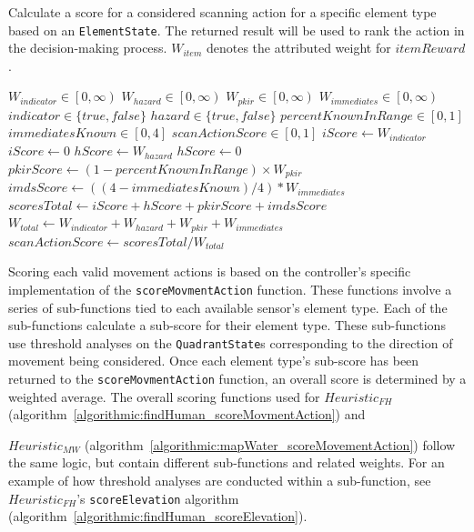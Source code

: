 \begin{algorithm}[H]
  \caption[Heuristic - Score Potential Scan Action]{Calculate a score for a considered scanning action for a specific element type based on an \texttt{ElementState}. The returned result will be used to rank the action in the decision-making process. $W_{item}$ denotes the attributed weight for $itemReward$.}
  \begin{algorithmic} \label{algorithmic:score_scan_action}
    \REQUIRE $W_{indicator} \in \left[0, \infty \right)$
    \REQUIRE $W_{hazard} \in \left[0, \infty \right)$
    \REQUIRE $W_{pkir} \in \left[0, \infty \right)$
    \REQUIRE $W_{immediates} \in \left[0, \infty \right)$
    \REQUIRE $indicator \in \{true, false\}$
    \REQUIRE $hazard \in \{true, false\}$
    \REQUIRE $percentKnownInRange \in \left[0, 1 \right]$
    \REQUIRE $immediatesKnown \in \left[0, 4 \right]$
    \ENSURE $scanActionScore \in \left[0, 1 \right]$
      \STATE $iScore \leftarrow W_{indicator}$
    \ELSE
      \STATE $iScore \leftarrow 0$
    \ENDIF
      \STATE $hScore \leftarrow W_{hazard}$
    \ELSE
      \STATE $hScore \leftarrow 0$
    \ENDIF
    \STATE $pkirScore \leftarrow (1 - percentKnownInRange) \times W_{pkir}$
    \STATE $imdsScore \leftarrow ((4 - immediatesKnown) / 4) * W_{immediates}$
    \STATE $scoresTotal \leftarrow iScore + hScore + pkirScore + imdsScore$
    \STATE $W_{total} \leftarrow W_{indicator} + W_{hazard} + W_{pkir} + W_{immediates}$
    \RETURN $scanActionScore \leftarrow scoresTotal / W_{total}$
  \end{algorithmic}
\end{algorithm}
\vspace*{-2em}

Scoring each valid movement actions is based on the controller's specific implementation of the \texttt{scoreMovmentAction} function.
These functions involve a series of sub-functions tied to each available sensor's element type.
Each of the sub-functions calculate a sub-score for their element type.
These sub-functions use threshold analyses on the \texttt{QuadrantState}s corresponding to the direction of movement being considered.
Once each element type's sub-score has been returned to the \texttt{scoreMovmentAction} function, an overall score is determined by a weighted average.
The overall scoring functions used for $Heuristic_{FH}$ (algorithm~\ref{algorithmic:findHuman_scoreMovmentAction}) and

\noindent
$Heuristic_{MW}$ (algorithm~\ref{algorithmic:mapWater_scoreMovementAction}) follow the same logic, but contain different sub-functions and related weights.
For an example of how threshold analyses are conducted within a sub-function, see $Heuristic_{FH}$'s \texttt{scoreElevation} algorithm (algorithm~\ref{algorithmic:findHuman_scoreElevation}).


